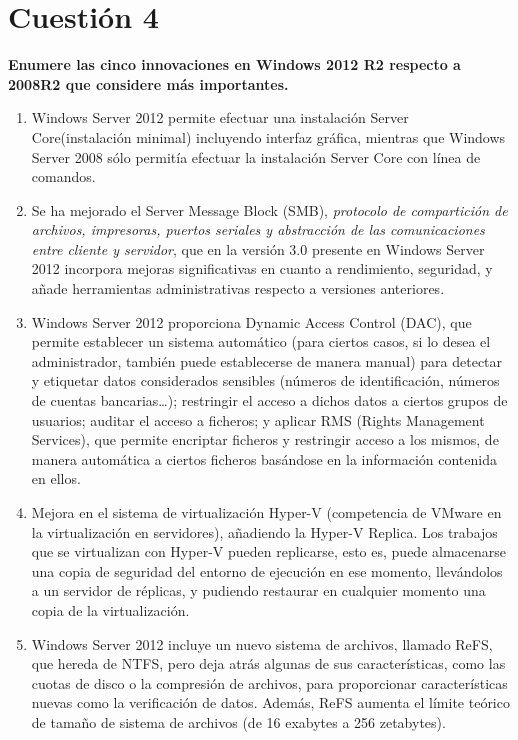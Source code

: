 \documentclass[a4paper,11pt]{article}
\newenvironment{answer}{%
\begin{list}{}{%
\addtolength{\hoffset}{0cm}
}%
\item[]}{\end{list}}
\begin{document}
\section{Cuestión 4}
\textbf{Enumere las cinco innovaciones en Windows 2012 R2 respecto a 2008R2 que considere más importantes.}
\begin{answer}
\begin{enumerate}
 \item Windows Server 2012 permite efectuar una instalación Server Core(instalación minimal) incluyendo interfaz gráfica,
 mientras que Windows Server 2008 sólo permitía efectuar la instalación Server Core con línea de comandos.
 \item Se ha mejorado el Server Message Block (SMB), \textit{protocolo de compartición de archivos, impresoras, puertos seriales y abstracción de
 las comunicaciones entre cliente y servidor}, %
 que en la versión 3.0 presente en Windows Server 2012 incorpora mejoras significativas en cuanto a rendimiento, seguridad,
 y añade herramientas administrativas respecto a versiones anteriores.
 \item Windows Server 2012 proporciona Dynamic Access Control (DAC), que permite establecer un sistema automático (para
 ciertos casos, si lo desea el administrador, también puede establecerse de manera manual) para detectar y etiquetar
 datos considerados sensibles (números de identificación, números de cuentas bancarias\ldots); restringir el acceso a
 dichos datos a ciertos grupos de usuarios; auditar el acceso a ficheros; y aplicar RMS (Rights Management Services), que permite
 encriptar ficheros y restringir acceso a los mismos, de manera automática a ciertos ficheros basándose en la información contenida en ellos.
 \item Mejora en el sistema de virtualización Hyper-V (competencia de VMware en la virtualización en servidores),
 añadiendo la Hyper-V Replica. Los trabajos que se virtualizan con Hyper-V pueden replicarse, esto es, puede almacenarse
 una copia de seguridad del entorno de ejecución en ese momento, llevándolos a un servidor de réplicas, y pudiendo
 restaurar en cualquier momento una copia de la virtualización.
 \item Windows Server 2012 incluye un nuevo sistema de archivos, llamado ReFS, que hereda de NTFS, pero deja atrás
 algunas de sus características, como las cuotas de disco o la compresión de archivos, para proporcionar características
 nuevas como la verificación de datos. Además, ReFS aumenta el límite teórico de tamaño de sistema de archivos (de 16
 exabytes a 256 zetabytes).
\end{enumerate}
\end{answer}
\end{document}

